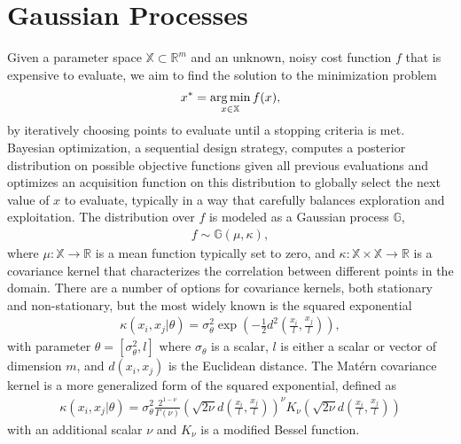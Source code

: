 \section{Gaussian Processes}
\label{gp}

Given a parameter space $\mathbb{X} \subset \mathbb{R}^m$ and an unknown, noisy cost function $f$ that is expensive to evaluate, we aim to find the solution to the minimization problem
\begin{align}
  x^* = \operatorname*{arg\,min}_{x \in \mathbb{X}} f(x),
\end{align}
by iteratively choosing points to evaluate until a stopping criteria is met. Bayesian optimization, a sequential design strategy, computes a posterior distribution on possible objective functions given all previous evaluations and optimizes an acquisition function on this distribution to globally select the next value of $x$ to evaluate, typically in a way that carefully balances exploration and exploitation. The distribution over $f$ is modeled as a Gaussian process \citep{Rasmussen2006} $\mathbb{G}$, 
\begin{align}
  f \sim \mathbb{G}(\mu, \kappa), 
\end{align}
where $\mu : \mathbb{X} \rightarrow \mathbb{R}$ is a mean function typically set to zero, and $\kappa : \mathbb{X}\times \mathbb{X} \rightarrow \mathbb{R}$ is a covariance kernel that characterizes the correlation between different points in the domain. There are a number of options for covariance kernels, both stationary and non-stationary, but the most widely known is the squared exponential
\begin{align}
  \kappa(x_i, x_j \vert \theta) = \sigma_\theta^2 \exp(-\frac{1}{2}d^2(\frac{x_i}{l}, \frac{x_j}{l})),
\end{align}
with parameter $\theta = [\sigma_\theta^2, l]$ where $\sigma_{\theta}$ is a scalar, $l$ is either a scalar or vector of dimension $m$, and $d(x_i, x_j)$ is the Euclidean distance. The Matérn covariance kernel is a more generalized form of the squared exponential, defined as
\begin{align}
	\kappa(x_i, x_j \vert \theta) = \sigma_\theta^2\frac{2^{1-\nu}}{\Gamma(\nu)}(\sqrt{2\nu} d(\frac{x_i}{l}, \frac{x_j}{l}))^\nu K_\nu (\sqrt{2\nu} d(\frac{x_i}{l}, \frac{x_j}{l}))
\end{align}
with an additional scalar $\nu$ and $K_\nu$ is a modified Bessel function.
